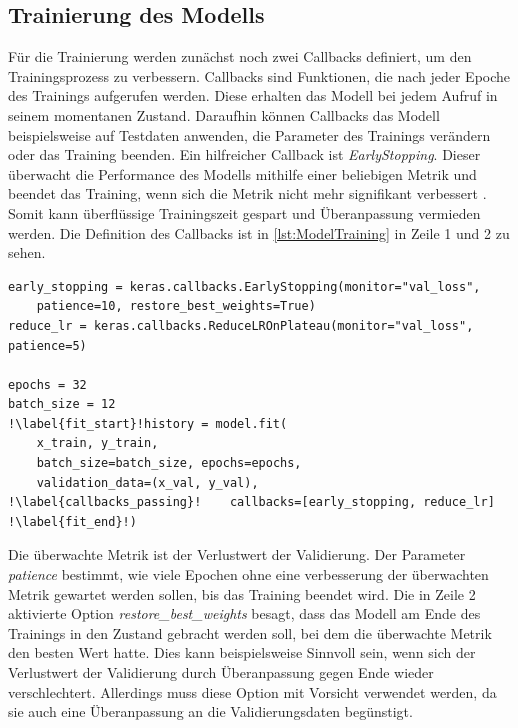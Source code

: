 \subsection{Trainierung des Modells}
\label{sec:Trainierung}
Für die Trainierung werden zunächst noch zwei Callbacks definiert, um den Trainingsprozess zu verbessern.
Callbacks sind Funktionen, die nach jeder Epoche des Trainings aufgerufen werden.
Diese erhalten das Modell bei jedem Aufruf in seinem momentanen Zustand.
Daraufhin können Callbacks das Modell beispielsweise auf Testdaten anwenden, die Parameter des Trainings verändern oder das Training beenden.
Ein hilfreicher Callback ist \emph{EarlyStopping}.
Dieser überwacht die Performance des Modells mithilfe einer beliebigen Metrik und beendet das Training, wenn sich die Metrik nicht mehr signifikant verbessert \cite{KerasEarlyStopping}.
Somit kann überflüssige Trainingszeit gespart und Überanpassung vermieden werden.
Die Definition des Callbacks ist in \autoref{lst:ModelTraining} in Zeile 1 und 2 zu sehen.

\begin{code}
\begin{verbatim}
early_stopping = keras.callbacks.EarlyStopping(monitor="val_loss",
    patience=10, restore_best_weights=True)
reduce_lr = keras.callbacks.ReduceLROnPlateau(monitor="val_loss", patience=5)

epochs = 32
batch_size = 12
!\label{fit_start}!history = model.fit(
    x_train, y_train,
    batch_size=batch_size, epochs=epochs,
    validation_data=(x_val, y_val),
!\label{callbacks_passing}!    callbacks=[early_stopping, reduce_lr]
!\label{fit_end}!)
\end{verbatim}
\label{lst:ModelTraining}
\end{code}

Die überwachte Metrik ist der Verlustwert der Validierung.
Der Parameter \emph{patience} bestimmt, wie viele Epochen ohne eine verbesserung der überwachten Metrik gewartet werden sollen, bis das Training beendet wird.
Die in Zeile 2 aktivierte Option \emph{restore\_best\_weights} besagt, dass das Modell am Ende des Trainings in den Zustand gebracht werden soll, bei dem die überwachte Metrik den besten Wert hatte.
Dies kann beispielsweise Sinnvoll sein, wenn sich der Verlustwert der Validierung durch Überanpassung gegen Ende wieder verschlechtert.
Allerdings muss diese Option mit Vorsicht verwendet werden, da sie auch eine Überanpassung an die Validierungsdaten begünstigt.

